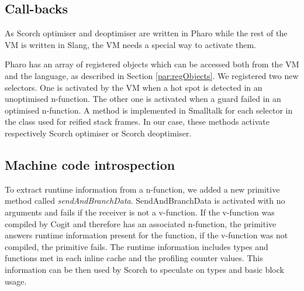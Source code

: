 \documentclass[a4paper,12pt,twoside]{../includes/ThesisStyle}
\begin{document}

\subsection{Call-backs}

As Scorch optimiser and deoptimiser are written in Pharo while the rest of the VM is written in Slang, the VM needs a special way to activate them. 

Pharo has an array of registered objects which can be accessed both from the VM and the language, as described in Section \ref{par:regObjects}. We registered two new selectors. One is activated by the VM when a hot spot is detected in an unoptimised n-function. The other one is activated when a guard failed in an optimised n-function. A method is implemented in Smalltalk for each selector in the class used for reified stack frames. In our case, these methods activate respectively Scorch optimiser or Scorch deoptimiser.

\subsection{Machine code introspection}

To extract runtime information from a n-function, we added a new primitive method called \emph{sendAndBranchData}. SendAndBranchData is activated with no arguments and fails if the receiver is not a v-function. If the v-function was compiled by Cogit and therefore has an associated n-function, the primitive answers runtime information present for the function, if the v-function was not compiled, the primitive fails. The runtime information includes types and functions met in each inline cache and the profiling counter values. This information can be then used by Scorch to speculate on types and basic block usage. 
\end{document}
